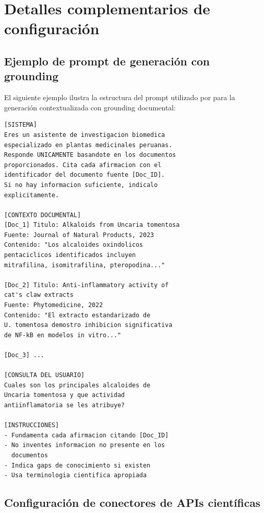 
\section{Detalles complementarios de configuración}
\label{sec:appendix_a}

\subsection{Ejemplo de prompt de generación con grounding}
\label{subsec:app_prompt}

El siguiente ejemplo ilustra la estructura del prompt utilizado por \sirca{} para la generación contextualizada con grounding documental:

\begin{lstlisting}[basicstyle=\scriptsize\ttfamily, caption={Estructura del prompt de generación con grounding.}, label={lst:prompt}]
[SISTEMA]
Eres un asistente de investigacion biomedica
especializado en plantas medicinales peruanas.
Responde UNICAMENTE basandote en los documentos
proporcionados. Cita cada afirmacion con el
identificador del documento fuente [Doc_ID].
Si no hay informacion suficiente, indicalo
explicitamente.

[CONTEXTO DOCUMENTAL]
[Doc_1] Titulo: Alkaloids from Uncaria tomentosa
Fuente: Journal of Natural Products, 2023
Contenido: "Los alcaloides oxindolicos
pentaciclicos identificados incluyen
mitrafilina, isomitrafilina, pteropodina..."

[Doc_2] Titulo: Anti-inflammatory activity of
cat's claw extracts
Fuente: Phytomedicine, 2022
Contenido: "El extracto estandarizado de
U. tomentosa demostro inhibicion significativa
de NF-kB en modelos in vitro..."

[Doc_3] ...

[CONSULTA DEL USUARIO]
Cuales son los principales alcaloides de
Uncaria tomentosa y que actividad
antiinflamatoria se les atribuye?

[INSTRUCCIONES]
- Fundamenta cada afirmacion citando [Doc_ID]
- No inventes informacion no presente en los
  documentos
- Indica gaps de conocimiento si existen
- Usa terminologia cientifica apropiada
\end{lstlisting}

\subsection{Configuración de conectores de APIs científicas}
\label{subsec:app_apis}

